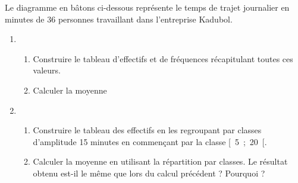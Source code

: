 \begin{Maquette}[Fiche,CorrigeFin,Colonnes=2]{}

   \begin{multicols}{2}

      \begin{exercice} %
         Le diagramme en bâtons ci-dessous représente le temps de trajet journalier en minutes de 36 personnes travaillant dans l'entreprise Kadubol. \par \medskip
         {\footnotesize
          }
         \vspace*{-5mm}
         \begin{enumerate}
            \item 
               \begin{enumerate}
                  \item Construire le tableau d'effectifs et de fréquences récapitulant toutes ces valeurs.
                  \item Calculer la moyenne
               \end{enumerate}
            \item
               \begin{enumerate}
                  \item Construire le tableau des effectifs en les regroupant par classes d'amplitude 15 minutes en commençant par la classe [~5~;~20~[.
                  \item Calculer la moyenne en utilisant la répartition par classes. Le résultat obtenu est-il le même que lors du calcul précédent ? Pourquoi ?
               \end{enumerate}
         \end{enumerate}
      \end{exercice}


\end{multicols}
\end{Maquette}
